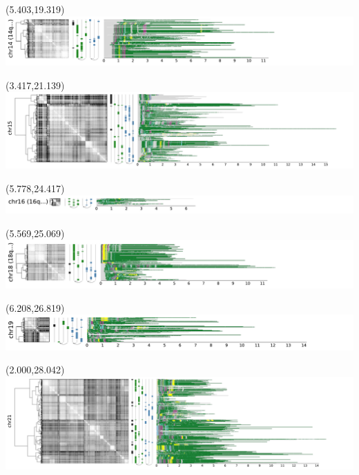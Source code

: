 \documentclass{article}
\begin{document}
\begin{textblock}{13}(5.403,19.319)\includegraphics{latex/figures/haplotypes/14qtel_1-500K_1_12_12_rc.pdf}\end{textblock}
\begin{textblock}{13}(3.417,21.139)\includegraphics{latex/figures/haplotypes/chr15.pdf}\end{textblock}
\begin{textblock}{13}(5.778,24.417)\includegraphics{latex/figures/haplotypes/16qtel_1-500K_1_12_12_rc.pdf}\end{textblock}
\begin{textblock}{13}(5.569,25.069)\includegraphics{latex/figures/haplotypes/18qtel_1-500K_1_12_12_rc.pdf}\end{textblock}
\begin{textblock}{13}(6.208,26.819)\includegraphics{latex/figures/haplotypes/chr19.pdf}\end{textblock}
\begin{textblock}{13}(2.000,28.042)\includegraphics{latex/figures/haplotypes/chr21.pdf}\end{textblock}
\end{document}
